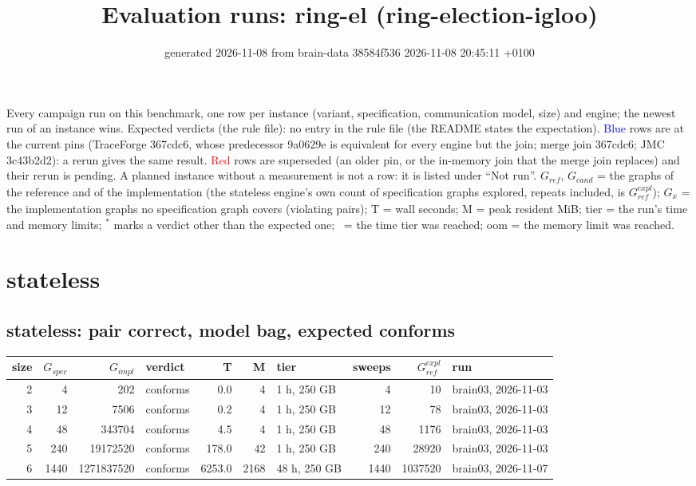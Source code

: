 \documentclass[10pt]{article}
\title{Evaluation runs: \textsf{ring-el} (ring-election-igloo)}
\author{}
\date{generated 2026-11-08 from brain-data 38584f536 2026-11-08 20:45:11 +0100}
\begin{document}
\maketitle\small
\noindent Every campaign run on this benchmark, one row per instance (variant, specification, communication model, size) and engine; the newest run of an instance wins. Expected verdicts (the rule file): no entry in the rule file (the README states the expectation). \textcolor{blue}{Blue} rows are at the current pins (TraceForge 367cdc6, whose predecessor 9a0629e is equivalent for every engine but the join; merge join 367cdc6; JMC 3c43b2d2): a rerun gives the same result. \textcolor{red}{Red} rows are superseded (an older pin, or the in-memory join that the merge join replaces) and their rerun is pending. A planned instance without a measurement is not a row: it is listed under ``Not run''. $G_{\mathit{ref}}$, $G_{\mathit{cand}}$ = the graphs of the reference and of the implementation (the stateless engine's own count of specification graphs explored, repeats included, is $G_{\mathit{ref}}^{\mathit{expl}}$); $G_x$ = the implementation graphs no specification graph covers (violating pairs); T = wall seconds; M = peak resident MiB; tier = the run's time and memory limits; $^{\ast}$ marks a verdict other than the expected one; \faClock\ = the time tier was reached; oom = the memory limit was reached.

\section*{stateless}
\subsection*{stateless: pair \textsf{correct}, model bag, expected conforms}
\begin{longtable}{@{}rrrlrrlrrl@{}}
\toprule
size & $G_{\mathit{spec}}$ & $G_{\mathit{impl}}$ & verdict & T & M & tier & sweeps & $G_{\mathit{ref}}^{\mathit{expl}}$ & run \\
\midrule
\endhead
\color{blue} 2 & 4 & 202 & conforms & 0.0 & 4 & 1 h, 250 GB & 4 & 10 & brain03, 2026-11-03 \\
\color{blue} 3 & 12 & 7506 & conforms & 0.2 & 4 & 1 h, 250 GB & 12 & 78 & brain03, 2026-11-03 \\
\color{blue} 4 & 48 & 343704 & conforms & 4.5 & 4 & 1 h, 250 GB & 48 & 1176 & brain03, 2026-11-03 \\
\color{blue} 5 & 240 & 19172520 & conforms & 178.0 & 42 & 1 h, 250 GB & 240 & 28920 & brain03, 2026-11-03 \\
\color{blue} 6 & 1440 & 1271837520 & conforms & 6253.0 & 2168 & 48 h, 250 GB & 1440 & 1037520 & brain03, 2026-11-07 \\
\bottomrule
\end{longtable}
\end{document}
